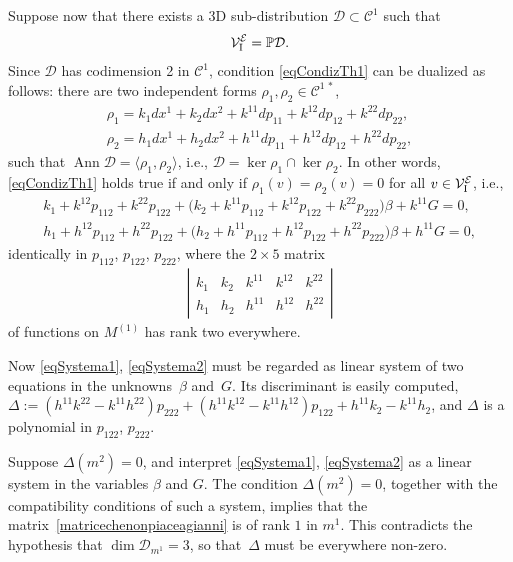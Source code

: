 \documentclass[pdftex]{sigma}
\newcommand{\C}{\mathcal{C}}
\newcommand{\D}{\mathcal{D}}
\newcommand{\MM}{\mathcal{V}_{\textrm{\normalfont I}}}
\newcommand{\E}{\mathcal{E}}
\newcommand{\Ann}{\operatorname{Ann}}
\renewcommand{\P}{\mathbb{P}}
\numberwithin{equation}{section}
\begin{document}
Suppose now that there exists a 3D sub-distribution $\D\subset\C ^1$ such that
\begin{gather}\label{eqCondizTh1}
\MM^\E=\P \D.
\end{gather}
Since $\D$ has codimension 2 in $\C ^1$, condition \eqref{eqCondizTh1} can be dualized as follows: there are two independent forms $\rho_1,\rho_2\in\C ^{1\, \ast}$,
\begin{gather*}
\rho_1 = k_1dx^1+k_2dx^2+k^{11}dp_{11}+k^{12}dp_{12}+k^{22}dp_{22},%
\\
\rho_2 = h_1dx^1+h_2dx^2+h^{11}dp_{11}+h^{12}dp_{12}+h^{22}dp_{22},%
\end{gather*}
such that $\Ann\D=\langle\rho_1,\rho_2\rangle$, i.e., $\D=\ker\rho_1\cap\ker\rho_2$. In other words, \eqref{eqCondizTh1} holds true if and only if $\rho_1(v)=\rho_2(v)=0$
for all $v\in\MM^\E$, i.e.,
\begin{gather}
k_1+k^{12}p_{112}+k^{22}p_{122}+\big(k_2+k^{11}p_{112}+k^{12}p_{122}+k^{22}p_{222}\big)\beta+k^{11}G = 0,\label{eqSystema1}\\
h_1+h^{12}p_{112}+h^{22}p_{122}+\big(h_2+h^{11}p_{112}+h^{12}p_{122}+h^{22}p_{222}\big)\beta+h^{11}G = 0,\label{eqSystema2}
\end{gather}
identically in $p_{112}$, $p_{122}$, $p_{222}$,
where the $2\times 5$ matrix{\samepage
 \begin{gather}\label{matricechenonpiaceagianni}
\left|\begin{matrix}k_1 & k_2 & k^{11} & k^{12} & k^{22} \\h_1 & h_2 & h^{11} & h^{12} & h^{22}\end{matrix}\right|
\end{gather}
of functions on $M^{(1)}$ has rank two everywhere.}

Now \eqref{eqSystema1}, \eqref{eqSystema2} must be regarded as linear system of two equations in the unknowns~$\beta$ and~$G$. Its discriminant is easily computed,
$\Delta:=(h^{11}k^{22}-k^{11}h^{22})p_{222}+(h^{11}k^{12}-k^{11}h^{12})p_{122}+h^{11}k_2-k^{11}h_2$,
and $\Delta$ is a polynomial in $p_{122}$, $p_{222}$.

Suppose $\Delta(m^2)=0$, and interpret \eqref{eqSystema1}, \eqref{eqSystema2} as a linear system in the variables $\beta$ and $G$. The condition $\Delta(m^2)=0$, together with the compatibility conditions of such a system, implies that the matrix~\eqref{matricechenonpiaceagianni} is of rank $1$ in $m^1$. This contradicts the hypothesis that $\dim\D_{m^1}=3$, so that~$\Delta$ must be everywhere non-zero.
\end{document}
